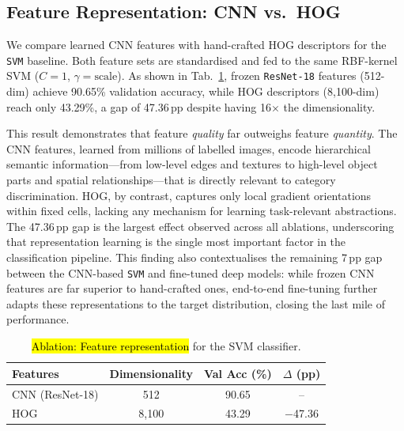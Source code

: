 \subsection{Feature Representation: CNN vs.\ HOG}

We compare learned CNN features with hand-crafted HOG descriptors for the \texttt{SVM} baseline. Both feature sets are standardised and fed to the same RBF-kernel SVM ($C{=}1$, $\gamma{=}\text{scale}$). As shown in Tab.~\ref{tab:ablation_feat}, frozen \texttt{ResNet-18} features (512-dim) achieve 90.65\% validation accuracy, while HOG descriptors (8{,}100-dim) reach only 43.29\%, a gap of 47.36\,pp despite having 16$\times$ the dimensionality.

This result demonstrates that feature \emph{quality} far outweighs feature \emph{quantity}. The CNN features, learned from millions of labelled images, encode hierarchical semantic information---from low-level edges and textures to high-level object parts and spatial relationships---that is directly relevant to category discrimination. HOG, by contrast, captures only local gradient orientations within fixed cells, lacking any mechanism for learning task-relevant abstractions. The 47.36\,pp gap is the largest effect observed across all ablations, underscoring that representation learning is the single most important factor in the classification pipeline. This finding also contextualises the remaining 7\,pp gap between the CNN-based \texttt{SVM} and fine-tuned deep models: while frozen CNN features are far superior to hand-crafted ones, end-to-end fine-tuning further adapts these representations to the target distribution, closing the last mile of performance.

\begin{table}[t]
\centering
\caption{\hl{Ablation: Feature representation} for the SVM classifier.}
\label{tab:ablation_feat}
\small
\begin{tabular}{lccc}
\toprule
Features & Dimensionality & Val Acc (\%) & $\Delta$ (pp) \\
\midrule
CNN (ResNet-18) & 512    & \cellcolor{blue!8}90.65 & -- \\
HOG             & 8{,}100 & 43.29 & $-$47.36 \\
\bottomrule
\end{tabular}
\end{table}
